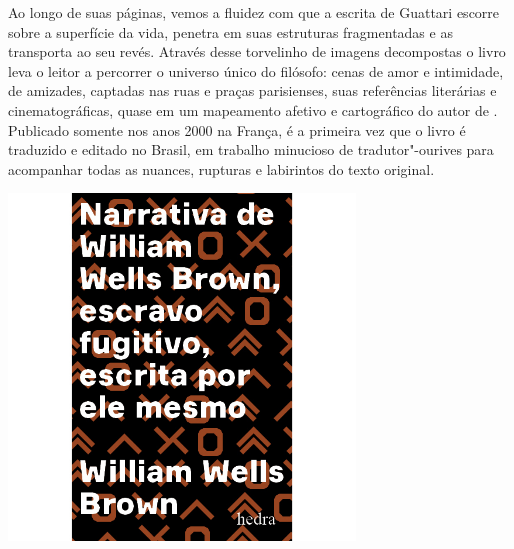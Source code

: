 Ao longo de suas páginas, vemos a fluidez com que a escrita de Guattari escorre sobre a superfície da vida, penetra em suas estruturas fragmentadas e as transporta ao seu revés. Através desse torvelinho de imagens decompostas o livro leva o leitor a percorrer o universo único do filósofo: cenas de amor e intimidade, de amizades, captadas nas ruas e praças parisienses, suas referências literárias e cinematográficas, quase em um mapeamento afetivo e cartográfico do autor de {}. Publicado somente nos anos 2000 na França, é a primeira vez que o livro é traduzido e editado no Brasil, em trabalho minucioso de tradutor"-ourives para acompanhar todas as nuances, rupturas e labirintos do texto original.

\vfill

\hspace*{-.4cm}\begin{minipage}[c]{.5\linewidth}
\small{
{}}
\end{minipage}

\pagebreak

\begin{center}
\hspace*{-2.5cm}
\hspace*{2.5cm}\includegraphics[width=92mm]{./grid/brown.jpg}
\end{center}

